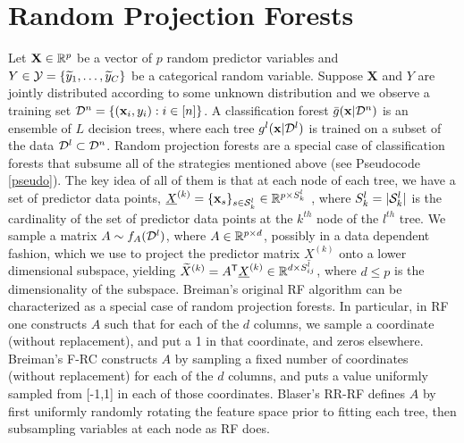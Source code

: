 \documentclass{article}
\begin{document}
\section{Random Projection Forests}
Let $\mathbf{X} \in \mathbb{R}^p$ be a vector of $p$ random predictor variables and $Y \in \mathcal{Y} = \{\widetilde{y}_1,\ldots,\widetilde{y}_C\}$ be a categorical random variable. Suppose $\mathbf{X}$ and $Y$ are jointly distributed according to some unknown distribution and we observe a training set $\mathcal{D}^n=\{(\mathbf{x}_i,y_i): i \in [n]\}$. A classification forest $\bar{g}(\mathbf{x} | \mathcal{D}^n)$ is an ensemble of $L$ decision trees, where each tree $g^l(\mathbf{x} | \mathcal{D}^l)$ is trained on a subset of the data $\mathcal{D}^l \subset \mathcal{D}^n$. Random projection forests are a special case of classification forests that subsume all of the strategies mentioned above (see Pseudocode \ref{pseudo}). The key idea of all of them is that at each node of each tree, we have a set of predictor data points, $\underline{X}^{(k)}=\{\mathbf{x}_s\}_{s \in \mathcal{S}^l_{k}} \in \mathbb{R}^{p \times S^l_{k}}$ , where  $S^l_{k}=|\mathcal{S}^l_{k}|$ is the cardinality of the set of predictor data points at the $k^{th}$ node of the $l^{th}$ tree.
We sample a matrix $A \sim f_A(\mathcal{D}^l)$, where $A \in \mathbb{R}^{p \times d}$, possibly in a data dependent fashion, which we use to project the predictor matrix $\underline{X}^{(k)}$ onto a lower dimensional subspace, yielding $\widetilde{X}^{(k)} = A^{\mathsf{T}} \underline{X}^{(k)} \in \mathbb{R}^{d \times S^l_{ij}}$, where $d \leq p$ is the dimensionality of the subspace. Breiman's original RF algorithm can be characterized as a special case of random projection forests. In particular, in RF one constructs $A$ such that for each of the $d$ columns, we sample a coordinate (without replacement), and put a 1 in that coordinate, and zeros elsewhere. Breiman's F-RC constructs $A$ by sampling a fixed number of coordinates (without replacement) for each of the $d$ columns, and puts a value uniformly sampled from [-1,1] in each of those coordinates. Blaser's RR-RF defines $A$ by first uniformly randomly rotating the feature space prior to fitting each tree, then subsampling variables at each node as RF does.
\end{document}
